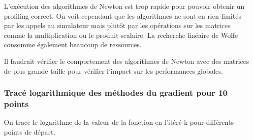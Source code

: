 \documentclass[a4paper,10pt]{article}
\begin{document}
\vspace{1cm}
L'exécution des algorithmes de Newton est trop rapide pour pouvoir obtenir un profiling correct.
On voit cependant que les algorithmes ne sont en rien limités par les appels au simulateur mais plutôt par les opérations sur les matrices comme la multiplication ou le produit scalaire. 
La recherche linéaire de Wolfe consomme également beaucoup de ressources.

Il faudrait vérifier le comportement des algorithmes de Newton avec des matrices de plus grande taille pour vérifier l'impact sur les performances globales.



\newpage
\subsubsection{Tracé logarithmique des méthodes du gradient pour 10 points}

\vspace{0.5cm}

\hspace{0.4cm}
On trace le logarithme de la valeur de la fonction en l'itéré k pour différents points de départ.

\begin{figure}[h!]
	\centering
\end{figure}
\end{document}
